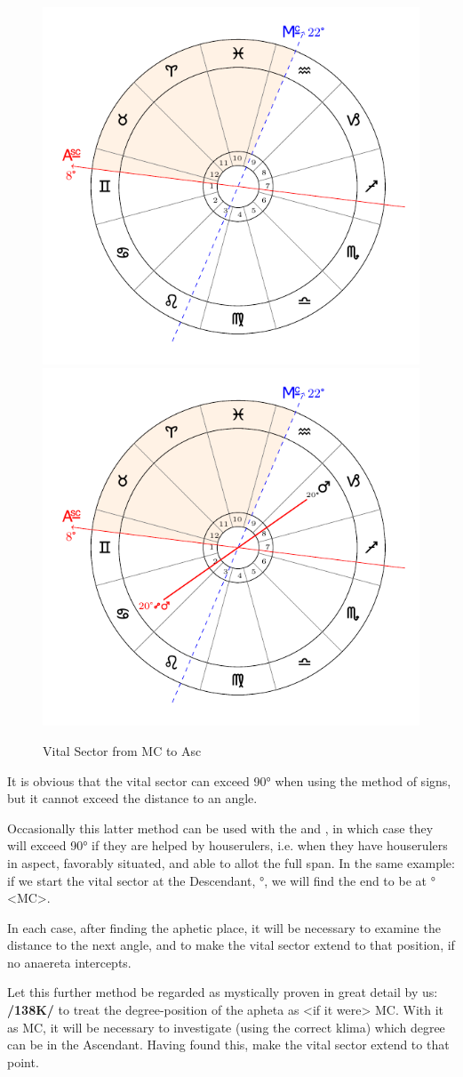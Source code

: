 \begin{figure}[H]
\includegraphics[width=.48\textwidth]{charts/3_03_1b}
\includegraphics[width=.48\textwidth]{charts/3_03_1c}
\caption{Vital Sector from MC to Asc}
\end{figure}

It is obvious that the vital sector can exceed 90° when using the method of signs, but it cannot exceed the distance to an angle.

Occasionally this latter method can be used with the \Sun\xspace and \Moon, in which case they will exceed 90° if they are helped by houserulers, i.e. when they have houserulers in aspect, favorably situated, and able to allot the full span. In the same example: if we start the vital sector at the Descendant, \Sagittarius\xspace 8°, we will find the end to be at \Aquarius\xspace 22° <MC>. 

In each case, after finding the aphetic place, it will be
necessary to examine the distance to the next angle, and to make the vital sector extend to that position, if no anaereta intercepts.

Let this further method be regarded as mystically proven in great detail by us: \textbf{/138K/} to treat the degree-position of the apheta as <if it were> MC. With it as MC, it will be necessary to investigate (using the correct klima) which degree can be in the Ascendant. Having found this, make the vital sector extend to that point. 


